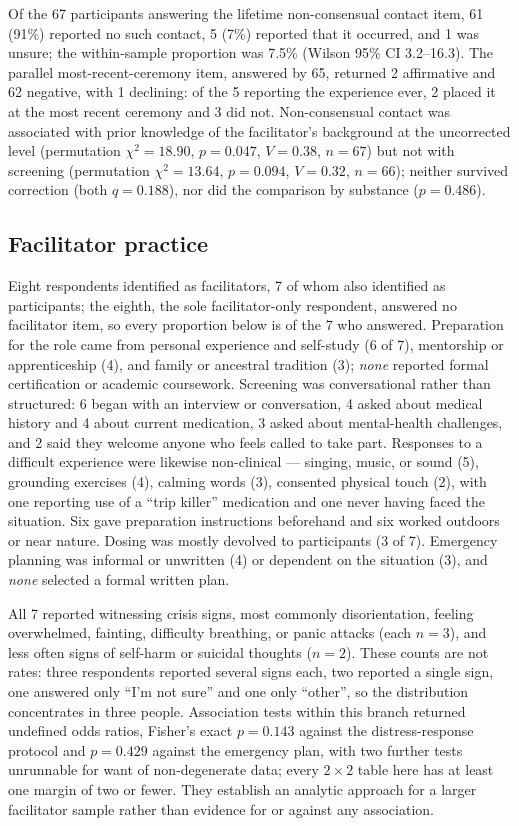 \documentclass[12pt]{article}
\begin{document}
Of the 67 participants answering the lifetime non-consensual contact item, 61 (91\%) reported no such
contact, 5 (7\%) reported that it occurred, and 1 was unsure; the within-sample proportion was 7.5\% (Wilson
95\% CI 3.2--16.3). The parallel most-recent-ceremony item, answered by 65, returned 2 affirmative and 62
negative, with 1 declining: of the 5 reporting the experience ever, 2 placed it at the most recent ceremony
and 3 did not. Non-consensual contact was associated with prior knowledge of the facilitator's background at
the uncorrected level (permutation $\chi^2=18.90$, $p=0.047$, $V=0.38$, $n=67$) but not with screening
(permutation $\chi^2=13.64$, $p=0.094$, $V=0.32$, $n=66$); neither survived correction (both $q=0.188$), nor
did the comparison by substance ($p=0.486$).

\subsection{Facilitator practice}

Eight respondents identified as facilitators, 7 of whom also identified as participants; the eighth, the
sole facilitator-only respondent, answered no facilitator item, so every proportion below is of the 7 who
answered. Preparation for the role came from personal experience and self-study (6 of 7), mentorship or
apprenticeship (4), and family or ancestral tradition (3); \emph{none} reported formal certification or
academic coursework. Screening was conversational rather than structured: 6 began with an interview or
conversation, 4 asked about medical history and 4 about current medication, 3 asked about mental-health
challenges, and 2 said they welcome anyone who feels called to take part. Responses to a difficult
experience were likewise non-clinical --- singing, music, or sound (5), grounding exercises (4), calming
words (3), consented physical touch (2), with one reporting use of a ``trip killer'' medication and one
never having faced the situation. Six gave preparation instructions beforehand and six worked outdoors or
near nature. Dosing was mostly devolved to participants (3 of 7). Emergency planning was informal or
unwritten (4) or dependent on the situation (3), and \emph{none} selected a formal written plan.

All 7 reported witnessing crisis signs, most commonly disorientation, feeling overwhelmed, fainting,
difficulty breathing, or panic attacks (each $n=3$), and less often signs of self-harm or suicidal thoughts
($n=2$). These counts are not rates: three respondents reported several signs each, two reported a single
sign, one answered only ``I'm not sure'' and one only ``other'', so the distribution concentrates in three
people. Association tests within this branch returned undefined odds ratios, Fisher's exact
$p=0.143$ against the distress-response protocol and $p=0.429$ against the emergency plan, with two further
tests unrunnable for want of non-degenerate data; every $2\times2$ table here has at least one margin of two
or fewer. They establish an analytic approach for a larger facilitator sample rather than evidence for or
against any association.
\end{document}
